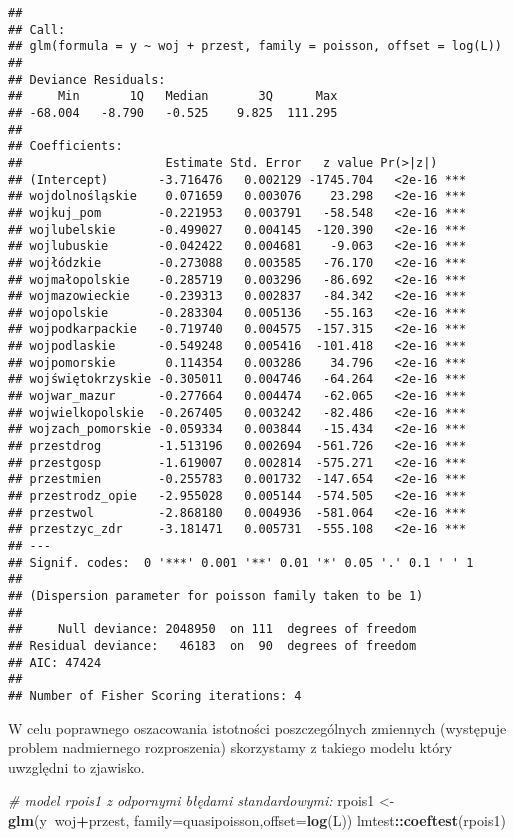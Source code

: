 \documentclass[polish,]{book}
\newenvironment{Shaded}{\begin{snugshade}}{\end{snugshade}}
\newcommand{\CommentTok}[1]{\textcolor[rgb]{0.56,0.35,0.01}{\textit{#1}}}
\newcommand{\DataTypeTok}[1]{\textcolor[rgb]{0.13,0.29,0.53}{#1}}
\newcommand{\KeywordTok}[1]{\textcolor[rgb]{0.13,0.29,0.53}{\textbf{#1}}}
\newcommand{\NormalTok}[1]{#1}
\newcommand{\OperatorTok}[1]{\textcolor[rgb]{0.81,0.36,0.00}{\textbf{#1}}}
\newcommand{\StringTok}[1]{\textcolor[rgb]{0.31,0.60,0.02}{#1}}
\begin{document}
\begin{verbatim}
## 
## Call:
## glm(formula = y ~ woj + przest, family = poisson, offset = log(L))
## 
## Deviance Residuals: 
##     Min       1Q   Median       3Q      Max  
## -68.004   -8.790   -0.525    9.825  111.295  
## 
## Coefficients:
##                    Estimate Std. Error   z value Pr(>|z|)    
## (Intercept)       -3.716476   0.002129 -1745.704   <2e-16 ***
## wojdolnośląskie    0.071659   0.003076    23.298   <2e-16 ***
## wojkuj_pom        -0.221953   0.003791   -58.548   <2e-16 ***
## wojlubelskie      -0.499027   0.004145  -120.390   <2e-16 ***
## wojlubuskie       -0.042422   0.004681    -9.063   <2e-16 ***
## wojłódzkie        -0.273088   0.003585   -76.170   <2e-16 ***
## wojmałopolskie    -0.285719   0.003296   -86.692   <2e-16 ***
## wojmazowieckie    -0.239313   0.002837   -84.342   <2e-16 ***
## wojopolskie       -0.283304   0.005136   -55.163   <2e-16 ***
## wojpodkarpackie   -0.719740   0.004575  -157.315   <2e-16 ***
## wojpodlaskie      -0.549248   0.005416  -101.418   <2e-16 ***
## wojpomorskie       0.114354   0.003286    34.796   <2e-16 ***
## wojświętokrzyskie -0.305011   0.004746   -64.264   <2e-16 ***
## wojwar_mazur      -0.277664   0.004474   -62.065   <2e-16 ***
## wojwielkopolskie  -0.267405   0.003242   -82.486   <2e-16 ***
## wojzach_pomorskie -0.059334   0.003844   -15.434   <2e-16 ***
## przestdrog        -1.513196   0.002694  -561.726   <2e-16 ***
## przestgosp        -1.619007   0.002814  -575.271   <2e-16 ***
## przestmien        -0.255783   0.001732  -147.654   <2e-16 ***
## przestrodz_opie   -2.955028   0.005144  -574.505   <2e-16 ***
## przestwol         -2.868180   0.004936  -581.064   <2e-16 ***
## przestzyc_zdr     -3.181471   0.005731  -555.108   <2e-16 ***
## ---
## Signif. codes:  0 '***' 0.001 '**' 0.01 '*' 0.05 '.' 0.1 ' ' 1
## 
## (Dispersion parameter for poisson family taken to be 1)
## 
##     Null deviance: 2048950  on 111  degrees of freedom
## Residual deviance:   46183  on  90  degrees of freedom
## AIC: 47424
## 
## Number of Fisher Scoring iterations: 4
\end{verbatim}

W celu poprawnego oszacowania istotności poszczególnych zmiennych (występuje
problem nadmiernego rozproszenia) skorzystamy z takiego modelu który uwzględni
to zjawisko.

\begin{Shaded}
\begin{Highlighting}[]
\CommentTok{# model rpois1 z odpornymi błędami standardowymi:}
\NormalTok{rpois1 <-}\StringTok{ }\KeywordTok{glm}\NormalTok{(y}\OperatorTok{~}\NormalTok{woj}\OperatorTok{+}\NormalTok{przest, }\DataTypeTok{family=}\NormalTok{quasipoisson,}\DataTypeTok{offset=}\KeywordTok{log}\NormalTok{(L))}
\NormalTok{lmtest}\OperatorTok{::}\KeywordTok{coeftest}\NormalTok{(rpois1)}
\end{Highlighting}
\end{Shaded}
\end{document}
